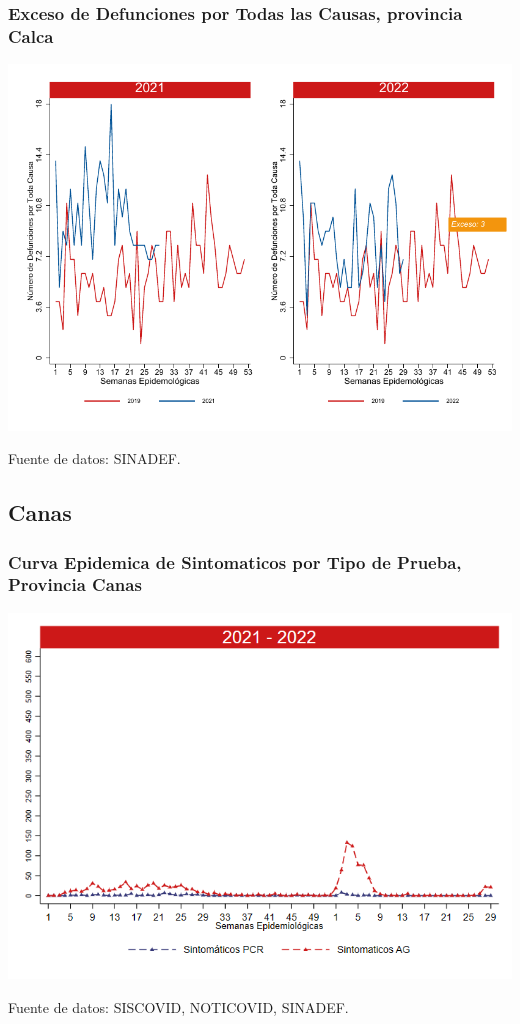 \documentclass[xcolor=table]{beamer}
\begin{document}
\begin{frame}
	\frametitle{Exceso de Defunciones por Todas las Causas, provincia Calca}
	\vspace{-.5cm}
	\begin{center}
		\includegraphics[width=0.8\linewidth, trim={0cm .5cm 0cm 0.2cm},clip]{../figuras/exceso_3.pdf}
	\end{center}
	{\tiny Fuente de datos: SINADEF.}
	
	\hyperlink{indicadores_provinciales}{}
\end{frame}

\subsection{Canas}
\begin{frame}[label=Canas]
	\frametitle{Curva Epidemica de Sintomaticos por Tipo de Prueba, Provincia Canas}
	\vspace{-.5cm}
	\begin{center}
		\includegraphics[width=0.8\linewidth, trim={0cm .5cm 0cm 0.2cm},clip]{../figuras/sinto_prueba20_21_4.png}
	\end{center}
	{\tiny Fuente de datos: SISCOVID, NOTICOVID, SINADEF.}
	\hyperlink{TipoPrueba}{}
\end{frame}
\end{document}

